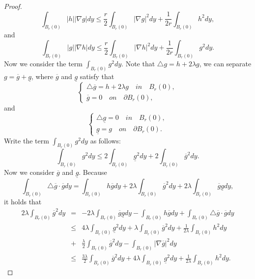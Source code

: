 \documentclass[a4paper, 12pt, onecolumn]{article} \textwidth 148mm
\begin{document}
\begin{proof}
\begin{equation*}
\int_{B_r(0)}|h||\nabla g|dy\leq\frac{r}{2}\int_{B_r(0)}|\nabla g|^2dy+\frac{1}{2r}\int_{B_r(0)}h^2dy,
\end{equation*}
and
\begin{equation*}
\int_{B_r(0)}|g||\nabla h|dy\leq\frac{r}{2}\int_{B_r(0)}|\nabla h|^2dy+\frac{1}{2r}\int_{B_r(0)}g^2dy.
\end{equation*}
Now we consider the term $\int_{B_r(0)}g^2dy$.
Note that $\triangle g=h+2\lambda g$, we can separate $g=\overline{g}+\underline{g}$, where $\overline{g}$ and $\underline{g}$ satisfy that
\begin{equation}
\begin{cases}
\triangle\overline{g}=h+2\lambda g\quad in\quad B_r(0),\\\nonumber
\overline{g}=0\quad on\quad \partial B_r(0),\nonumber
\end{cases}
\end{equation}
and
\begin{equation*}
\begin{cases}
\triangle\underline{g}=0\quad in\quad B_r(0),\\
\underline{g}=g\quad on\quad \partial B_r(0).
\end{cases}
\end{equation*}
Write the term $\int_{B_r(0)}g^2dy$ as follows:
\begin{equation*}
\int_{B_r(0)}g^2dy\leq2\int_{B_r(0)}\underline{g}^2dy+2\int_{B_r(0)}\overline{g}^2dy.
\end{equation*}
Now we consider $\overline{g}$ and $\underline{g}$.
Because
\begin{equation*}
\int_{B_r(0)}\triangle\overline{g}\cdot\overline{g}dy=\int_{B_r(0)}h\overline{g}dy+2\lambda\int_{B_r(0)}\overline{g}^2dy
+2\lambda\int_{B_r(0)}\overline{g}\underline{g}dy,
\end{equation*}
it holds that
\begin{eqnarray*}
2\lambda\int_{B_r(0)}\overline{g}^2dy&=&-2\lambda\int_{B_r(0)}\overline{g}\underline{g}dy-\int_{B_r(0)}h\overline{g}dy
+\int_{B_r(0)}\triangle\overline{g}\cdot\overline{g}dy
\\&\leq&4\lambda\int_{B_r(0)}\underline{g}^2dy+\lambda\int_{B_r(0)}\overline{g}^2dy+\frac{1}{2\lambda}\int_{B_r(0)}h^2dy
\\&+&\frac{\lambda}{2}\int_{B_r(0)}\overline{g}^2dy-\int_{B_r(0)}|\nabla\overline{g}|^2dy
\\&\leq&\frac{3\lambda}{2}\int_{B_r(0)}\overline{g}^2dy+4\lambda\int_{B_r(0)}\underline{g}^2dy
+\frac{1}{2\lambda}\int_{B_r(0)}h^2dy.

\end{eqnarray*}
\end{proof}
\end{document}
